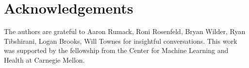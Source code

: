 \section{Acknowledgements}
The authors are grateful to Aaron Rumack, Roni Rosenfeld, Bryan Wilder, Ryan Tibshirani, Logan Brooks, Will Townes for insightful conversations. 
This work was supported by the fellowship from the Center for Machine Learning and Health at Carnegie Mellon. 

